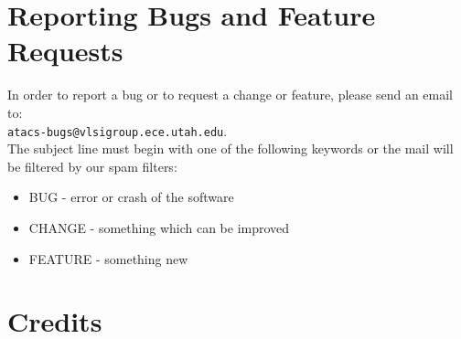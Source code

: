 \documentclass[titlepage,11pt]{article}
\begin{document}
\section{Reporting Bugs and Feature Requests}

\noindent
In order to report a bug or to request a change or feature, please
send an email to:\\ 
{\tt atacs-bugs@vlsigroup.ece.utah.edu}.\\
The subject line must begin with one of the following keywords or the
mail will be filtered by our spam filters:
\begin{itemize}
\item BUG - error or crash of the software
\item CHANGE - something which can be improved
\item FEATURE - something new
\end{itemize}

\section{Credits}
\end{document}
